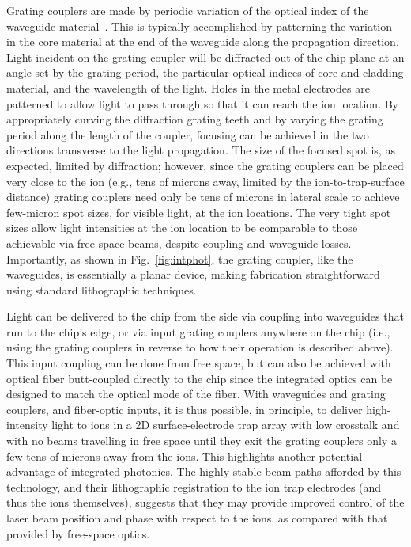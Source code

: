 \documentclass[%
reprint,
 amsmath,amssymb,
]{revtex4-1}
\begin{document}
Grating couplers are made by periodic variation of the optical index of the waveguide material~\cite{HeitmannGratingCoupler1981}.  This is typically accomplished by patterning the variation in the core material at the end of the waveguide along the propagation direction.  Light incident on the grating coupler will be diffracted out of the chip plane at an angle set by the grating period, the particular optical indices of core and cladding material, and the wavelength of the light. Holes in the metal electrodes are patterned to allow light to pass through so that it can reach the ion location. By appropriately curving the diffraction grating teeth and by varying the grating period along the length of the coupler, focusing can be achieved in the two directions transverse to the light propagation.  The size of the focused spot is, as expected, limited by diffraction; however, since the grating couplers can be placed very close to the ion (e.g., tens of microns away, limited by the ion-to-trap-surface distance) grating couplers need only be tens of microns in lateral scale to achieve few-micron spot sizes, for visible light, at the ion locations. The very tight spot sizes allow light intensities at the ion location to be comparable to those achievable via free-space beams, despite coupling and waveguide losses. Importantly, as shown in Fig.~\ref{fig:intphot}, the grating coupler, like the waveguides, is essentially a planar device, making fabrication straightforward using standard lithographic techniques.

Light can be delivered to the chip from the side via coupling into waveguides that run to the chip's edge, or via input grating couplers anywhere on the chip (i.e., using the grating couplers in reverse to how their operation is described above). This input coupling can be done from free space, but can also be achieved with optical fiber butt-coupled directly to the chip since the integrated optics can be designed to match the optical mode of the fiber.  With waveguides and grating couplers, and fiber-optic inputs, it is thus possible, in principle, to deliver high-intensity light to ions in a 2D surface-electrode trap array with low crosstalk and with no beams travelling in free space until they exit the grating couplers only a few tens of microns away from the ions.  This highlights another potential advantage of integrated photonics. The highly-stable beam paths afforded by this technology, and their lithographic registration to the ion trap electrodes (and thus the ions themselves), suggests that they may provide improved control of the laser beam position and phase with respect to the ions, as compared with that provided by free-space optics.
\end{document}
